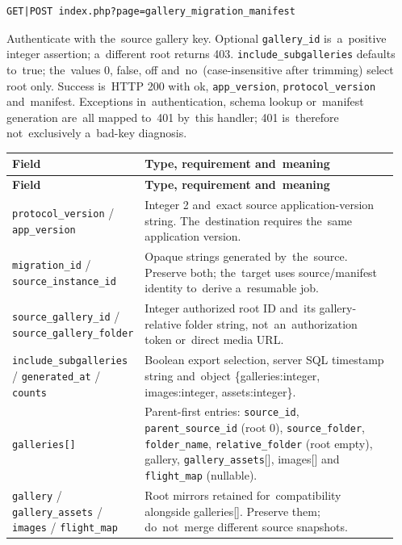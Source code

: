 \documentclass[11pt,a4paper]{article}
\newcommand{\codeword}[1]{\nolinkurl{#1}}
\begin{document}
\label{api352:migration-manifest}

\begin{lstlisting}[language={}]
GET|POST index.php?page=gallery_migration_manifest
\end{lstlisting}

Authenticate with the~source gallery key. Optional \codeword{gallery_id} is~a~positive
integer assertion; a~different root returns 403. \codeword{include_subgalleries} defaults
to~true; the~values 0, false, off and~no~(case-insensitive after trimming) select root only.
Success is~HTTP 200 with ok, \codeword{app_version}, \codeword{protocol_version}
and~manifest. Exceptions in~authentication, schema lookup or~manifest generation are~all
mapped to~401 by~this handler; 401 is~therefore not~exclusively a~bad-key diagnosis.

\begin{longtable}{@{}>{\RaggedRight\arraybackslash}p{0.28\linewidth}>{\RaggedRight\arraybackslash}p{0.67\linewidth}@{}}
\toprule
\textbf{Field} & \textbf{Type, requirement and~meaning} \\
\midrule
\endfirsthead
\toprule
\textbf{Field} & \textbf{Type, requirement and~meaning} \\
\midrule
\endhead
\bottomrule
\endfoot
\codeword{protocol_version} / \codeword{app_version} & Integer 2 and~exact source
application-version string. The~destination requires the~same application version. \\
\codeword{migration_id} / \codeword{source_instance_id} & Opaque strings generated
by~the~source. Preserve both; the~target uses source/manifest identity to~derive a~resumable
job. \\
\codeword{source_gallery_id} / \codeword{source_gallery_folder} & Integer authorized root ID
and~its gallery-relative folder string, not~an~authorization token or~direct media URL. \\
\codeword{include_subgalleries} / \codeword{generated_at} / \codeword{counts} & Boolean
export selection, server SQL timestamp string and~object \{galleries:integer,
images:integer, assets:integer\}. \\
\codeword{galleries[]} & Parent-first entries: \codeword{source_id},
\codeword{parent_source_id} (root 0), \codeword{source_folder}, \codeword{folder_name},
\codeword{relative_folder} (root empty), gallery, \codeword{gallery_assets}[], images[] and
\codeword{flight_map} (nullable). \\
\codeword{gallery} / \codeword{gallery_assets} / \codeword{images} / \codeword{flight_map} &
Root mirrors retained for~compatibility alongside galleries[]. Preserve them; do~not~merge
different source snapshots. \\
\end{longtable}
\end{document}
